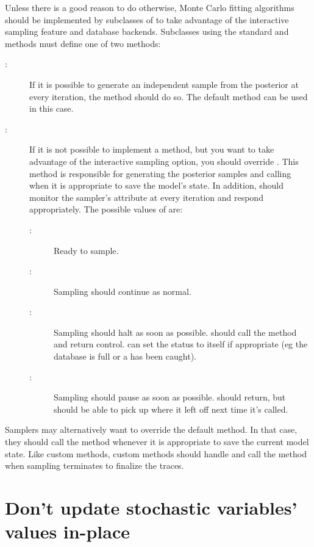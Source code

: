 Unless there is a good reason to do otherwise, Monte Carlo fitting algorithms should be implemented by subclasses of  to take advantage of the interactive sampling feature and database backends. Subclasses using the standard  and  methods must define one of two methods:
\begin{description}
   \item[:] If it is possible to generate an independent sample from the posterior at every iteration, the  method should do so. The default  method can be used in this case.
   \item[:] If it is not possible to implement a  method, but you want to take advantage of the interactive sampling option, you should override . This method is responsible for generating the posterior samples and calling  when it is appropriate to save the model's state. In addition,  should monitor the sampler's  attribute at every iteration and respond appropriately. The possible values of  are:
   \begin{description}
      \item[:] Ready to sample.
      \item[:] Sampling should continue as normal.
      \item[:] Sampling should halt as soon as possible.  should call the  method and return control.  can set the status to  itself if appropriate (eg the database is full or a  has been caught).
      \item[:] Sampling should pause as soon as possible.  should return, but should be able to pick up where it left off next time it's called.
   \end{description}
\end{description}

Samplers may alternatively want to override the default  method. In that case, they should call the  method whenever it is appropriate to save the current model state. Like custom  methods, custom  methods should handle  and call the  method when sampling terminates to finalize the traces.

\hypertarget{dont-update-indepth}{}
\section*{Don't update stochastic variables' values in-place} \label{dont-update-indepth}

